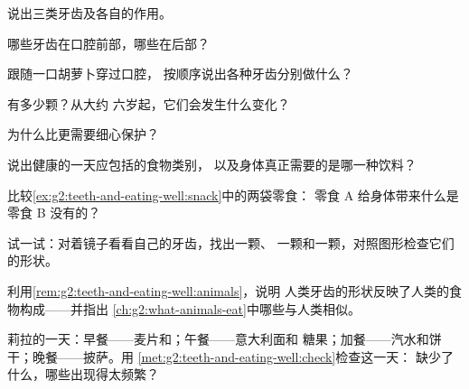 \begin{exercise}[$\star$]\label{exo:g2:teeth-and-eating-well:1}
说出三类牙齿及各自的作用。
\end{exercise}

\begin{exercise}[$\star$]\label{exo:g2:teeth-and-eating-well:2}
哪些牙齿在口腔前部，哪些在后部？
\end{exercise}

\begin{exercise}[$\star$]\label{exo:g2:teeth-and-eating-well:3}
跟随一口胡萝卜穿过口腔，
按顺序说出各种牙齿分别做什么？
\end{exercise}

\begin{exercise}[$\star$]\label{exo:g2:teeth-and-eating-well:4}
有多少颗？从大约
六岁起，它们会发生什么变化？
\end{exercise}

\begin{exercise}[$\star$]\label{exo:g2:teeth-and-eating-well:5}
为什么比更需要细心保护？
\end{exercise}

\begin{exercise}[$\star$]\label{exo:g2:teeth-and-eating-well:6}
说出健康的一天应包括的食物类别，
以及身体真正需要的是哪一种饮料？
\end{exercise}

\begin{exercise}[$\star$]\label{exo:g2:teeth-and-eating-well:7}
比较\cref{ex:g2:teeth-and-eating-well:snack}中的两袋零食：
零食 A 给身体带来什么是零食 B 没有的？
\end{exercise}

\begin{exercise}[$\star$]\label{exo:g2:teeth-and-eating-well:8}
试一试：对着镜子看看自己的牙齿，找出一颗、
一颗和一颗，对照图形检查它们的形状。
\end{exercise}

\begin{exercise}[$\star\star$]\label{exo:g2:teeth-and-eating-well:9}
利用\cref{rem:g2:teeth-and-eating-well:animals}，说明
人类牙齿的形状反映了人类的食物构成——并指出
\cref{ch:g2:what-animals-eat}中哪些与人类相似。
\end{exercise}

\begin{exercise}[$\star\star$]\label{exo:g2:teeth-and-eating-well:10}
莉拉的一天：早餐——麦片和；午餐——意大利面和
糖果；加餐——汽水和饼干；晚餐——披萨。用
\cref{met:g2:teeth-and-eating-well:check}检查这一天：
缺少了什么，哪些出现得太频繁？
\end{exercise}
